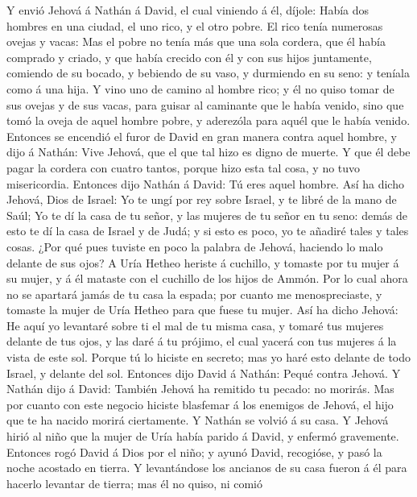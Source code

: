  Y envió Jehová á Nathán á David, el cual viniendo á él,
díjole: Había dos hombres en una ciudad, el uno rico, y el otro pobre.
 El rico tenía numerosas ovejas y vacas:  Mas el
pobre no tenía más que una sola cordera, que él había comprado y criado,
y que había crecido con él y con sus hijos juntamente, comiendo de su
bocado, y bebiendo de su vaso, y durmiendo en su seno: y teníala como á
una hija.  Y vino uno de camino al hombre rico; y él no
quiso tomar de sus ovejas y de sus vacas, para guisar al caminante que
le había venido, sino que tomó la oveja de aquel hombre pobre, y
aderezóla para aquél que le había venido.  Entonces se
encendió el furor de David en gran manera contra aquel hombre, y dijo á
Nathán: Vive Jehová, que el que tal hizo es digno de muerte.
 Y que él debe pagar la cordera con cuatro tantos, porque
hizo esta tal cosa, y no tuvo misericordia.  Entonces dijo
Nathán á David: Tú eres aquel hombre. Así ha dicho Jehová, Dios de
Israel: Yo te ungí por rey sobre Israel, y te libré de la mano de Saúl;
 Yo te dí la casa de tu señor, y las mujeres de tu señor en
tu seno: demás de esto te dí la casa de Israel y de Judá; y si esto es
poco, yo te añadiré tales y tales cosas.  ¿Por qué pues
tuviste en poco la palabra de Jehová, haciendo lo malo delante de sus
ojos? A Uría Hetheo heriste á cuchillo, y tomaste por tu mujer á su
mujer, y á él mataste con el cuchillo de los hijos de Ammón.
 Por lo cual ahora no se apartará jamás de tu casa la
espada; por cuanto me menospreciaste, y tomaste la mujer de Uría Hetheo
para que fuese tu mujer.  Así ha dicho Jehová: He aquí yo
levantaré sobre ti el mal de tu misma casa, y tomaré tus mujeres delante
de tus ojos, y las daré á tu prójimo, el cual yacerá con tus mujeres á
la vista de este sol.  Porque tú lo hiciste en secreto; mas
yo haré esto delante de todo Israel, y delante del sol. 
Entonces dijo David á Nathán: Pequé contra Jehová. Y Nathán dijo á
David: También Jehová ha remitido tu pecado: no morirás. 
Mas por cuanto con este negocio hiciste blasfemar á los enemigos de
Jehová, el hijo que te ha nacido morirá ciertamente.  Y
Nathán se volvió á su casa. Y Jehová hirió al niño que la mujer de Uría
había parido á David, y enfermó gravemente.  Entonces rogó
David á Dios por el niño; y ayunó David, recogióse, y pasó la noche
acostado en tierra.  Y levantándose los ancianos de su casa
fueron á él para hacerlo levantar de tierra; mas él no quiso, ni comió
